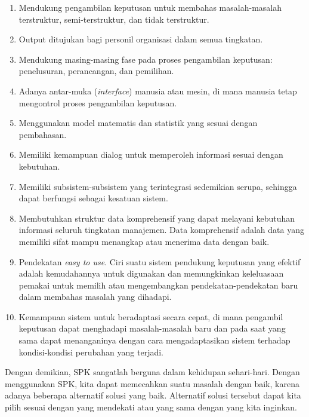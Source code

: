 		\begin{enumerate}
			\item Mendukung pengambilan keputusan untuk membahas masalah-masalah terstruktur, semi-terstruktur, dan tidak terstruktur.
			\item Output ditujukan bagi personil organisasi dalam semua tingkatan.
			\item Mendukung masing-masing fase pada proses pengambilan keputusan: penelusuran, perancangan, dan pemilihan.
			\item Adanya antar-muka (\textit{interface}) manusia atau mesin, di mana manusia tetap mengontrol proses pengambilan keputusan.
			\item Menggunakan model matematis dan statistik yang sesuai dengan pembahasan.
			\item Memiliki kemampuan dialog untuk memperoleh informasi sesuai dengan kebutuhan.
			\item Memiliki subsistem-subsistem yang terintegrasi sedemikian serupa, sehingga dapat berfungsi sebagai kesatuan sistem.
			\item Membutuhkan struktur data komprehensif yang dapat melayani kebutuhan informasi seluruh tingkatan manajemen. Data komprehensif adalah data yang memiliki sifat mampu menangkap atau menerima data dengan baik.
			\item Pendekatan \textit{easy to use}. Ciri suatu sistem pendukung keputusan yang efektif adalah kemudahannya untuk digunakan dan memungkinkan keleluasaan pemakai untuk memilih atau mengembangkan pendekatan-pendekatan baru dalam membahas masalah yang dihadapi.
			\item Kemampuan sistem untuk beradaptasi secara cepat, di mana pengambil keputusan dapat menghadapi masalah-masalah baru dan pada saat yang sama dapat menanganinya dengan cara mengadaptasikan sistem terhadap kondisi-kondisi perubahan yang terjadi.
		\end{enumerate}
		
		Dengan demikian, SPK sangatlah berguna dalam kehidupan sehari-hari. Dengan menggunakan SPK, kita dapat memecahkan suatu masalah dengan baik, karena adanya beberapa alternatif solusi yang baik. Alternatif solusi tersebut dapat kita pilih sesuai dengan yang mendekati atau yang sama dengan yang kita inginkan.
		
		
